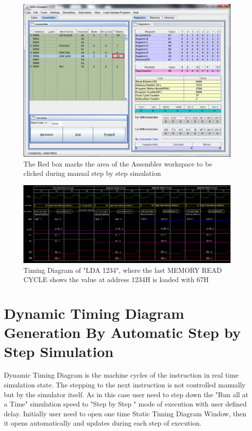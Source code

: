 \begin{figure}[htbp]
\centering
\includegraphics[width=0.75\linewidth]{./TStateEditorAfter}
\caption{The Red box marks the area of the Assembler workspace to be clicked during manual step by step simulation}
\label{fig:tstate:after:editor}
\end{figure}
\begin{figure}[htbp]
\centering
\includegraphics[width=\linewidth]{./TStateAfter}
\caption{Timing Diagram of "LDA 1234", where the last MEMORY READ CYCLE shows the value at address 1234H is loaded with 67H}
\label{fig:tstate:after:diagram}
\end{figure}
\pagebreak
\section{Dynamic Timing Diagram Generation By Automatic Step by Step Simulation}
Dynamic Timing Diagram is the machine cycles of the instruction in real time simulation state. The stepping to the next instruction is not controlled manually but by the simulator itself. As in this case user need to step down the "Run all at a Time" simulation speed to "Step by Step " mode of execution with user defined delay. Initially user need to open one time Static Timing Diagram Window, then it opens automatically and updates during each step of execution.